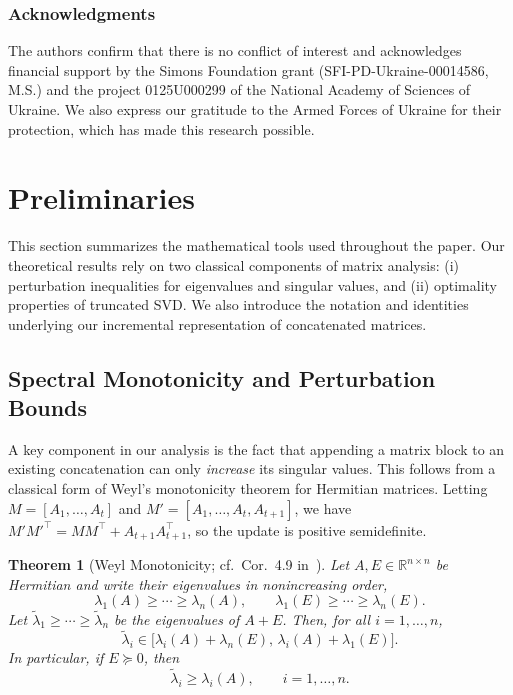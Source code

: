 \documentclass[10pt]{article} %
\newtheorem{theorem}{Theorem}
\begin{document}
\subsubsection*{Acknowledgments}
The authors confirm that there is no conflict of interest and acknowledges financial support by the Simons Foundation grant (SFI-PD-Ukraine-00014586, M.S.) and the
project 0125U000299 of the National Academy of Sciences of Ukraine. We also express our gratitude to the Armed Forces of Ukraine for their protection, which has made this research possible.





\appendix

\section{Preliminaries}
\label{appendix:preliminaries}

This section summarizes the mathematical tools used throughout the paper.  
Our theoretical results rely on two classical components of matrix analysis:  
(i) perturbation inequalities for eigenvalues and singular values, and  
(ii) optimality properties of truncated SVD.  
We also introduce the notation and identities underlying our incremental 
representation of concatenated matrices.

\subsection{Spectral Monotonicity and Perturbation Bounds}

A key component in our analysis is the fact that appending a matrix block
to an existing concatenation can only \emph{increase} its singular values.
This follows from a classical form of Weyl’s monotonicity theorem for
Hermitian matrices.  Letting $M=[A_1,\dots,A_t]$ and 
$M'=[A_1,\dots,A_t,A_{t+1}]$, we have
$M'M'^\top = MM^\top + A_{t+1}A_{t+1}^\top$, so the update is positive
semidefinite.

\begin{theorem}[Weyl Monotonicity; cf.\ Cor.~4.9 in~\citet{stewart_sun1990}]
\label{thm:weyl-monotonicity}
Let $A,E\in\mathbb{R}^{n\times n}$ be Hermitian and write their eigenvalues in
nonincreasing order,
\[
  \lambda_1(A)\ge \cdots \ge \lambda_n(A), 
  \qquad
  \lambda_1(E)\ge \cdots \ge \lambda_n(E).
\]
Let $\tilde{\lambda}_1\ge\cdots\ge\tilde{\lambda}_n$ be the eigenvalues of 
$A+E$.  
Then, for all $i=1,\dots,n$,
\[
  \tilde{\lambda}_i \in 
  \bigl[
    \lambda_i(A)+\lambda_n(E),\,
    \lambda_i(A)+\lambda_1(E)
  \bigr].
\]
In particular, if $E\succeq 0$, then
\[
  \tilde{\lambda}_i \ge \lambda_i(A),
  \qquad i=1,\dots,n.
\]
\end{theorem}
\end{document}
